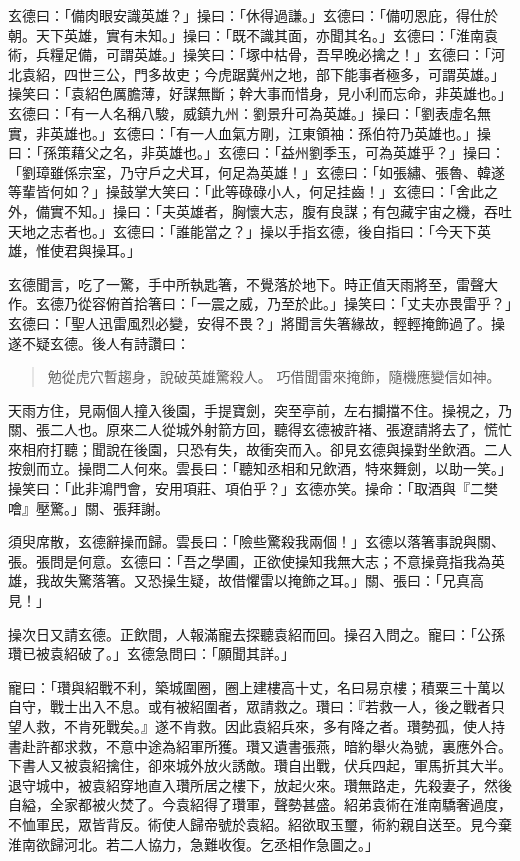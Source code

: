 玄德曰：「備肉眼安識英雄？」操曰：「休得過謙。」玄德曰：「備叨恩庇，得仕於朝。天下英雄，實有未知。」操曰：「既不識其面，亦聞其名。」玄德曰：「淮南袁術，兵糧足備，可謂英雄。」操笑曰：「塚中枯骨，吾早晚必擒之！」玄德曰：「河北袁紹，四世三公，門多故吏；今虎踞冀州之地，部下能事者極多，可謂英雄。」操笑曰：「袁紹色厲膽薄，好謀無斷；幹大事而惜身，見小利而忘命，非英雄也。」玄德曰：「有一人名稱八駿，威鎮九州：劉景升可為英雄。」操曰：「劉表虛名無實，非英雄也。」玄德曰：「有一人血氣方剛，江東領袖：孫伯符乃英雄也。」操曰：「孫策藉父之名，非英雄也。」玄德曰：「益州劉季玉，可為英雄乎？」操曰：「劉璋雖係宗室，乃守戶之犬耳，何足為英雄！」玄德曰：「如張繡、張魯、韓遂等輩皆何如？」操鼓掌大笑曰：「此等碌碌小人，何足挂齒！」玄德曰：「舍此之外，備實不知。」操曰：「夫英雄者，胸懷大志，腹有良謀；有包藏宇宙之機，吞吐天地之志者也。」玄德曰：「誰能當之？」操以手指玄德，後自指曰：「今天下英雄，惟使君與操耳。」

玄德聞言，吃了一驚，手中所執匙箸，不覺落於地下。時正值天雨將至，雷聲大作。玄德乃從容俯首拾箸曰：「一震之威，乃至於此。」操笑曰：「丈夫亦畏雷乎？」玄德曰：「聖人迅雷風烈必變，安得不畏？」將聞言失箸緣故，輕輕掩飾過了。操遂不疑玄德。後人有詩讚曰：

\begin{quote}
勉從虎穴暫趨身，說破英雄驚殺人。
巧借聞雷來掩飾，隨機應變信如神。
\end{quote}

天雨方住，見兩個人撞入後園，手提寶劍，突至亭前，左右攔擋不住。操視之，乃關、張二人也。原來二人從城外射箭方回，聽得玄德被許褚、張遼請將去了，慌忙來相府打聽；聞說在後園，只恐有失，故衝突而入。卻見玄德與操對坐飲酒。二人按劍而立。操問二人何來。雲長曰：「聽知丞相和兄飲酒，特來舞劍，以助一笑。」操笑曰：「此非鴻門會，安用項莊、項伯乎？」玄德亦笑。操命：「取酒與『二樊噲』壓驚。」關、張拜謝。

須臾席散，玄德辭操而歸。雲長曰：「險些驚殺我兩個！」玄德以落箸事說與關、張。張問是何意。玄德曰：「吾之學圃，正欲使操知我無大志；不意操竟指我為英雄，我故失驚落箸。又恐操生疑，故借懼雷以掩飾之耳。」關、張曰：「兄真高見！」

操次日又請玄德。正飲間，人報滿寵去探聽袁紹而回。操召入問之。寵曰：「公孫瓚已被袁紹破了。」玄德急問曰：「願聞其詳。」

寵曰：「瓚與紹戰不利，築城圍圈，圈上建樓高十丈，名曰易京樓；積粟三十萬以自守，戰士出入不息。或有被紹圍者，眾請救之。瓚曰：『若救一人，後之戰者只望人救，不肯死戰矣。』遂不肯救。因此袁紹兵來，多有降之者。瓚勢孤，使人持書赴許都求救，不意中途為紹軍所獲。瓚又遺書張燕，暗約舉火為號，裏應外合。下書人又被袁紹擒住，卻來城外放火誘敵。瓚自出戰，伏兵四起，軍馬折其大半。退守城中，被袁紹穿地直入瓚所居之樓下，放起火來。瓚無路走，先殺妻子，然後自縊，全家都被火焚了。今袁紹得了瓚軍，聲勢甚盛。紹弟袁術在淮南驕奢過度，不恤軍民，眾皆背反。術使人歸帝號於袁紹。紹欲取玉璽，術約親自送至。見今棄淮南欲歸河北。若二人協力，急難收復。乞丞相作急圖之。」

